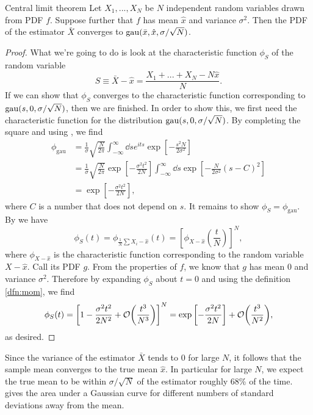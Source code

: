 \begin{theorem}{Central limit theorem}{}
  Let $X_1,...,X_N$ be $N$ independent random variables drawn from PDF $f$.
  Suppose further that $f$ has mean $\hat{x}$ and variance $\sigma^2$. 
  Then the PDF of the estimator $\bar{X}$ converges to 
  $\operatorname{gau}(\bar{x},\hat{x},\sigma/\sqrt{N})$.
  \begin{proof}
    What we're going to do is look at the characteristic function 
    $\phi_S$ of the random variable
    $$
      S\equiv\bar{X}-\hat{x}=\frac{X_1+...+X_N-N\hat{x}}{N}.
    $$
    If we can show that $\phi_S$ converges to the characteristic function
    corresponding to $\operatorname{gau}(s,0,\sigma/\sqrt{N})$, then we are finished.
    In order to show this, we first need the characteristic function for
    the distribution $\operatorname{gau}(s,0,\sigma/\sqrt{N})$. By completing the
    square and using , we find 
    \begin{equation*}
      \begin{aligned}
        \phi_{\text{gau}}
            &=\frac{1}{\sigma}\sqrt{\frac{N}{2\pi}}\int_{-\infty}^\infty\dd{s}
              e^{its}\exp\left[-\frac{s^2N}{2\sigma^2}\right]\\
            &=\frac{1}{\sigma}\sqrt{\frac{N}{2\pi}}
              \exp\left[-\frac{\sigma^2t^2}{2N}\right]
              \int_{-\infty}^\infty\dd{s}
              \exp\left[-\frac{N}{2\sigma^2}(s-C)^2\right]\\
            &=\exp\left[-\frac{\sigma^2t^2}{2N}\right],
      \end{aligned}
    \end{equation*}
    where $C$ is a number that does not depend on $s$. It remains to show 
    $\phi_S=\phi_{\text{gau}}$. By  we have
    $$
      \phi_S(t)=\phi_{\frac{1}{N}\sum X_i-\hat{x}}(t)
               =\left[\phi_{X-\hat{x}}\left(\frac{t}{N}\right)\right]^N,
    $$
    where $\phi_{X-\hat{x}}$ is the characteristic function corresponding
    to the random variable $X-\hat{x}$. Call its PDF $g$. From the
    properties of $f$, we know that $g$ has mean 0 and variance $\sigma^2$.
    Therefore by expanding $\phi_S$ about $t=0$ and using the 
    definition \eqref{dfn:mom}, we find
    $$
      \phi_S(t)=\left[1-\frac{\sigma^2t^2}{2N^2}
             +\order{\frac{t^3}{N^3}}\right]^N
               =\exp\left[-\frac{\sigma^2t^2}{2N}\right]
             +\order{\frac{t^3}{N^2}},
    $$
    as desired.
  \end{proof}
\end{theorem}
Since the variance of the estimator $\bar{X}$ tends to 0 for large $N$,
it follows that the sample mean converges to the true mean $\hat{x}$.
In particular for large $N$, we expect the true mean to be within
$\sigma/\sqrt{N}$ of the estimator roughly 68\% of the time.
 gives the area under a Gaussian curve 
for different numbers of standard deviations away from the mean. 

